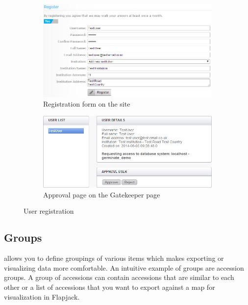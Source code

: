 \begin{figure}
    \centering
    \begin{subfigure}[b]{0.475\textwidth}
        \centering
        \includegraphics[width=1.0\textwidth]{img/features/registration.png}
        \caption{Registration form on the {\germinate} site}
        \label{fig:user_registration_registration}
    \end{subfigure}
    \hspace*{0.5cm}
    \begin{subfigure}[b]{0.475\textwidth}
        \centering
        \includegraphics[width=1.0\textwidth]{img/features/registration-approve.png}
        \caption{Approval page on the Gatekeeper page}
        \label{fig:user_registration_approval}
    \end{subfigure}
    \caption{User registration}
    \label{fig:user_registration}
\end{figure}

\subsection{Groups}
{\germinate} allows you to define groupings of various items which makes exporting or visualizing data more comfortable. An intuitive example of groups are accession groups. A group of accessions can contain accessions that are similar to each other or a list of accessions that you want to export against a map for visualization in Flapjack.

